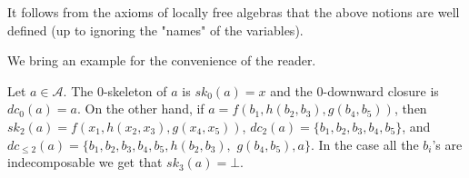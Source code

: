 \documentclass[a4paper,11pt]{article}
\begin{document}
\begin{remark}
It follows from the axioms of locally free algebras that the above notions are well defined (up to ignoring the "names" of the variables). 
\end{remark}

We bring an example for the convenience of the reader. 
\begin{example}
Let $a\in \mathcal{A}$. The $0$-skeleton of $a$ is $sk_0(a)=x$ and the $0$-downward closure is  $dc_0(a)=a$. On the other hand, if $a=f(b_1, h(b_2, b_3),g(b_4, b_5))$, then $sk_2(a)=f(x_1, h(x_2,x_3), g(x_4,x_5))$, $dc_2(a)=\{b_1, b_2, b_3, b_4, b_5\}$, and $dc_{\leq 2}(a)=\{b_1, b_2, b_3, b_4, b_5, h(b_2,b_3),$ $g(b_4, b_5), a\}$. In the case all the $b_i$'s are indecomposable we get that $sk_3(a)=\bot$.
\end{example}
\end{document}
